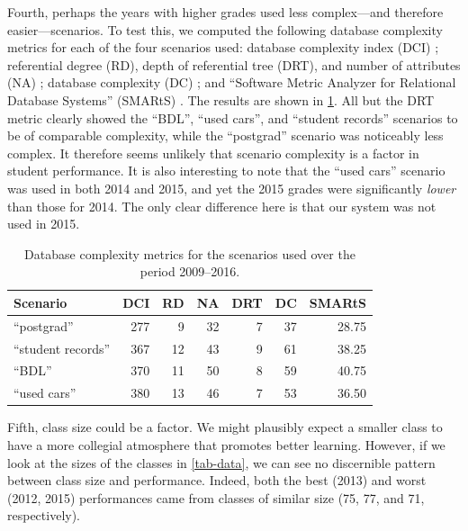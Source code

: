 \documentclass[sigconf, review, anonymous, capitalise]{acmart}
\begin{document}
Fourth, perhaps the years with higher grades used less complex---and therefore easier---scenarios. To test this, we computed the following database complexity metrics for each of the four scenarios used: database complexity index (DCI) \cite{Sinha.B-2014a-Estimation}; referential degree (RD), depth of referential tree (DRT), and number of attributes (NA) \cite{Calero.C-2001a-Database,Piattini.M-2001a-Table}; database complexity (DC) \cite{Pavlic.M-2008a-Database}; and ``Software Metric Analyzer for Relational Database Systems'' (SMARtS)
\cite{Jamil.B-2010a-SMARtS}. The results are shown in \cref{tab-metrics}. All but the DRT metric clearly showed the ``BDL'', ``used cars'', and ``student records'' scenarios to be of comparable complexity, while the ``postgrad'' scenario was noticeably less complex. It therefore seems unlikely that scenario complexity is a factor in student performance. It is also interesting to note that the ``used cars'' scenario was used in both 2014 and 2015, and yet the 2015 grades were significantly \emph{lower} than those for 2014. The only clear difference here is that our system was not used in 2015.


\begin{table}
    \caption{Database complexity metrics for the scenarios used over the period 2009--2016.}
    \label{tab-metrics}
    \begin{tabular}{lrrrrrr}
        \toprule
            Scenario            &   DCI &   RD  &   NA  &   DRT &   DC  &   SMARtS  \\
            \midrule
            ``postgrad''        &   277 &   9   &   32  &   7   &   37  &   28.75   \\
            ``student records'' &   367 &   12  &   43  &   9   &   61  &   38.25   \\
            ``BDL''             &   370 &   11  &   50  &   8   &   59  &   40.75   \\
            ``used cars''       &   380 &   13  &   46  &   7   &   53  &   36.50    \\
        \bottomrule
    \end{tabular}
\end{table}


Fifth, class size could be a factor. We might plausibly expect a smaller class to have a more collegial atmosphere that promotes better learning. However, if we look at the sizes of the classes in \cref{tab-data}, we can see no discernible pattern between class size and performance. Indeed, both the best (2013) and worst (2012, 2015) performances came from classes of similar size (75, 77, and 71, respectively).
\end{document}

